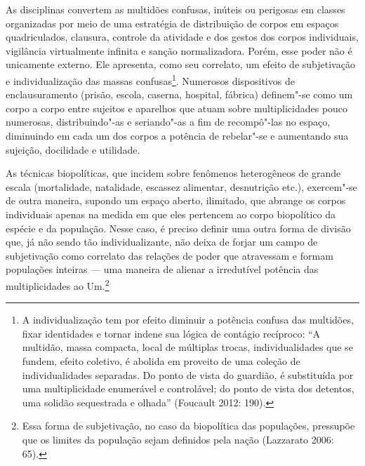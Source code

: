 As disciplinas convertem as multidões confusas, inúteis ou perigosas em
classes organizadas por meio de uma estratégia de distribuição de corpos
em espaços quadriculados, clausura, controle da atividade e dos gestos
dos corpos individuais, vigilância virtualmente infinita e sanção
normalizadora. Porém, esse poder não é unicamente externo. Ele
apresenta, como seu correlato, um efeito de subjetivação e
individualização das massas confusas\footnote{A
  individualização tem por efeito diminuir a potência confusa das
  multidões, fixar identidades e tornar indene sua lógica de contágio
  recíproco: ``A multidão, massa compacta, local de múltiplas trocas,
  individualidades que se fundem, efeito coletivo, é abolida em proveito
  de uma coleção de individualidades separadas. Do ponto de vista do
  guardião, é substituída por uma multiplicidade enumerável e
  controlável; do ponto de vista dos detentos, uma solidão sequestrada e
  olhada'' (Foucault 2012: 190).}. Numerosos dispositivos de
enclausuramento (prisão, escola, caserna, hospital, fábrica) definem"-se
como um corpo a corpo entre sujeitos e aparelhos que atuam sobre
multiplicidades pouco numerosas, distribuindo"-as e seriando"-as a fim de
recompô"-las no espaço, diminuindo em cada um dos corpos a potência de
rebelar"-se e aumentando sua sujeição, docilidade e utilidade.

As técnicas biopolíticas, que incidem sobre fenômenos heterogêneos de
grande escala (mortalidade, natalidade, escassez alimentar, desnutrição
etc.), exercem"-se de outra maneira, supondo um espaço aberto, ilimitado,
que abrange os corpos individuais apenas na medida em que eles pertencem
ao corpo biopolítico da espécie e da população. Nesse caso, é preciso
definir uma outra forma de divisão que, já não sendo tão
individualizante, não deixa de forjar um campo de subjetivação como
correlato das relações de poder que atravessam e formam populações
inteiras --- uma maneira de alienar a irredutível potência das
multiplicidades ao Um.\footnote{Essa forma de
  subjetivação, no caso da biopolítica das populações, pressupõe que os
  limites da população sejam definidos pela nação (Lazzarato 2006: 65).}

